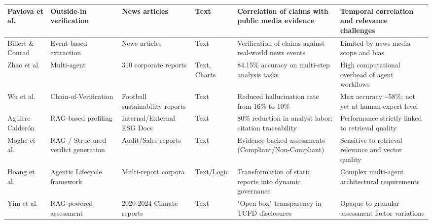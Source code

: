 \documentclass[english, online, cse, master]{dithesis}
\begin{document}
\begin{landscape}
\begin{table}[p]
\begin{tabularx}{\linewidth}{|p{1.8cm}|X|X|p{1.8cm}|X|X|}
Pavlova et al.  \parencite{mariya_pavlova_259be499} & Outside-in verification & News articles & Text & Correlation of claims with public media evidence & Temporal correlation and relevance challenges \\ \hline
Billert \& Conrad  \parencite{fabian_billert_a5fbb687} & Event-based extraction & News articles & Text & Verification of claims against real-world news events & Limited by news media scope and bias \\ \hline
Zhao et al.  \parencite{yilei_zhao_b7bbd9c8} & Multi-agent & 310 corporate reports & Text, Charts & 84.15\% accuracy on multi-step analysis tasks & High computational overhead of agent workflows \\ \hline
Wu et al.  \parencite{yue_wu_cae353aa} & Chain-of-Verification & Football sustainability reports & Text & Reduced hallucination rate from 16\% to 10\% & Max accuracy \textasciitilde{}58\%; not yet at human-expert level \\ \hline
Aguirre Calderón  \parencite{juan_aguirre_calder_n_5eae82e0} & RAG-based profiling & Internal/External ESG Docs & Text & 80\% reduction in analyst labor; citation traceability & Performance strictly linked to retrieval quality \\ \hline
Moghe et al.  \parencite{abhijeet_b__moghe_963e6c96} & RAG / Structured verdict generation & Audit/Sales reports & Text & Evidence-backed assessments (Compliant/Non-Compliant) & Sensitive to retrieval relevance and vector quality \\ \hline
Hoang et al.  \parencite{thong_hoang_d30a390b} & Agentic Lifecycle framework & Multi-report corpora & Text/Logic & Transformation of static reports into dynamic governance & Complex multi-agent architectural requirements \\ \hline
Yim et al.  \parencite{tik_yu_yim_951fa18a} & RAG-powered assessment & 2020-2024 Climate reports & Text & "Open box" transparency in TCFD disclosures & Opaque to granular assessment factor variations \\ \hline
\end{tabularx}
\end{table}
\end{landscape}
\end{document}
